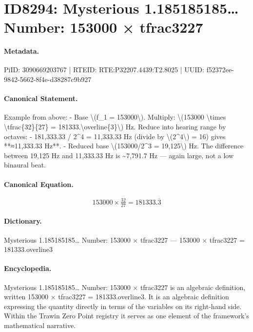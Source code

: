 \section*{ID8294: Mysterious 1.185185185… Number: 153000 × tfrac3227}
\paragraph{Metadata.}
PiID: 3090669203767 | RTEID: RTE:P32207.4439:T2.8025 | UUID: f52372ee-9842-5662-8f4e-d38287c9b927

\paragraph{Canonical Statement.}
Example from above: - Base \textbackslash{}(f\_1 = 153000\textbackslash{}). Multiply: \textbackslash{}(153000 \textbackslash{}times \textbackslash{}tfrac\{32\}\{27\} = 181333.\textbackslash{}overline\{3\}\textbackslash{}) Hz. Reduce into hearing range by octaves: - 181,333.33 / 2\textasciicircum{}4 = 11,333.33 Hz (divide by \textbackslash{}(2\textasciicircum{}4\textbackslash{}) = 16) gives **≈11,333.33 Hz**. - Reduced base \textbackslash{}(153000/2\textasciicircum{}3 = 19,125\textbackslash{}) Hz. The difference between 19,125 Hz and 11,333.33 Hz is \textasciitilde{}7,791.7 Hz — again large, not a low binaural beat.

\paragraph{Canonical Equation.}
\[
153000 \times \tfrac{32}{27} = 181333.\overline{3}
\]

\paragraph{Dictionary.}
Mysterious 1.185185185… Number: 153000 × tfrac3227 — 153000 × tfrac3227 = 181333.overline3

\paragraph{Encyclopedia.}
Mysterious 1.185185185… Number: 153000 × tfrac3227 is an algebraic definition, written 153000 × tfrac3227 = 181333.overline3. It is an algebraic definition expressing the quantity directly in terms of the variables on its right-hand side. Within the Trawin Zero Point registry it serves as one element of the framework's mathematical narrative.
